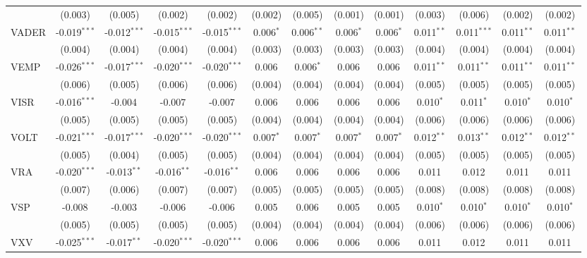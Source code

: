 \begin{table}[!htbp]
\begin{tabular}{@{\extracolsep{5pt}}lcccccccccccc}
  & (0.003) & (0.005) & (0.002) & (0.002) & (0.002) & (0.005) & (0.001) & (0.001) & (0.003) & (0.006) & (0.002) & (0.002) \\
 VADER & -0.019$^{***}$ & -0.012$^{***}$ & -0.015$^{***}$ & -0.015$^{***}$ & 0.006$^{*}$ & 0.006$^{**}$ & 0.006$^{*}$ & 0.006$^{*}$ & 0.011$^{**}$ & 0.011$^{***}$ & 0.011$^{**}$ & 0.011$^{**}$ \\
  & (0.004) & (0.004) & (0.004) & (0.004) & (0.003) & (0.003) & (0.003) & (0.003) & (0.004) & (0.004) & (0.004) & (0.004) \\
 VEMP & -0.026$^{***}$ & -0.017$^{***}$ & -0.020$^{***}$ & -0.020$^{***}$ & 0.006$^{}$ & 0.006$^{*}$ & 0.006$^{}$ & 0.006$^{}$ & 0.011$^{**}$ & 0.011$^{**}$ & 0.011$^{**}$ & 0.011$^{**}$ \\
  & (0.006) & (0.005) & (0.006) & (0.006) & (0.004) & (0.004) & (0.004) & (0.004) & (0.005) & (0.005) & (0.005) & (0.005) \\
 VISR & -0.016$^{***}$ & -0.004$^{}$ & -0.007$^{}$ & -0.007$^{}$ & 0.006$^{}$ & 0.006$^{}$ & 0.006$^{}$ & 0.006$^{}$ & 0.010$^{*}$ & 0.011$^{*}$ & 0.010$^{*}$ & 0.010$^{*}$ \\
  & (0.005) & (0.005) & (0.005) & (0.005) & (0.004) & (0.004) & (0.004) & (0.004) & (0.006) & (0.006) & (0.006) & (0.006) \\
 VOLT & -0.021$^{***}$ & -0.017$^{***}$ & -0.020$^{***}$ & -0.020$^{***}$ & 0.007$^{*}$ & 0.007$^{*}$ & 0.007$^{*}$ & 0.007$^{*}$ & 0.012$^{**}$ & 0.013$^{**}$ & 0.012$^{**}$ & 0.012$^{**}$ \\
  & (0.005) & (0.004) & (0.005) & (0.005) & (0.004) & (0.004) & (0.004) & (0.004) & (0.005) & (0.005) & (0.005) & (0.005) \\
 VRA & -0.020$^{***}$ & -0.013$^{**}$ & -0.016$^{**}$ & -0.016$^{**}$ & 0.006$^{}$ & 0.006$^{}$ & 0.006$^{}$ & 0.006$^{}$ & 0.011$^{}$ & 0.012$^{}$ & 0.011$^{}$ & 0.011$^{}$ \\
  & (0.007) & (0.006) & (0.007) & (0.007) & (0.005) & (0.005) & (0.005) & (0.005) & (0.008) & (0.008) & (0.008) & (0.008) \\
 VSP & -0.008$^{}$ & -0.003$^{}$ & -0.006$^{}$ & -0.006$^{}$ & 0.005$^{}$ & 0.006$^{}$ & 0.005$^{}$ & 0.005$^{}$ & 0.010$^{*}$ & 0.010$^{*}$ & 0.010$^{*}$ & 0.010$^{*}$ \\
  & (0.005) & (0.005) & (0.005) & (0.005) & (0.004) & (0.004) & (0.004) & (0.004) & (0.006) & (0.006) & (0.006) & (0.006) \\
 VXV & -0.025$^{***}$ & -0.017$^{**}$ & -0.020$^{***}$ & -0.020$^{***}$ & 0.006$^{}$ & 0.006$^{}$ & 0.006$^{}$ & 0.006$^{}$ & 0.011$^{}$ & 0.012$^{}$ & 0.011$^{}$ & 0.011$^{}$ \\

\end{tabular}
\end{table}
